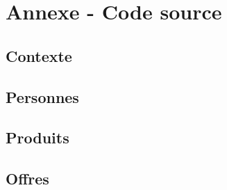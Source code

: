 \documentclass{article}
\begin{document}
 \clearpage
 
\section*{Annexe - Code source}

\subsection*{Contexte}




\subsection*{Personnes}







\subsection*{Produits}








\subsection*{Offres}





\end{document}
